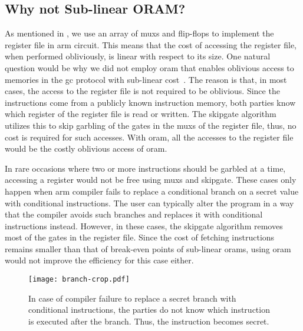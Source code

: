 \subsection{Why not Sub-linear ORAM?}
As mentioned in , we use an array of \acrshort{mux}s and flip-flops to implement the register file in \gls{arm} circuit.
This means that the cost of accessing the register file, when performed obliviously, is linear with respect to its size.
One natural question would be why we did not employ \acrfull{oram} that enables oblivious access to memories in the \acrshort{gc} protocol with sub-linear cost~\cite{wang2014scoram, zahur2016revisit}.
The reason is that, in most cases, the access to the register file is not required to be oblivious.
Since the instructions come from a publicly known instruction memory, both parties know which register of the register file is read or written.
The \gls{skipgate} algorithm utilizes this to skip garbling of the gates in the \acrshort{mux}s of the register file, thus, no cost is required for such accesses.
With \acrshort{oram}, all the accesses to the register file would be the costly oblivious access of \acrshort{oram}.

In rare occasions where two or more instructions should be garbled at a time, accessing a register would not be free using \acrshort{mux}s and \gls{skipgate}.
These cases only happen when \gls{arm} compiler fails to replace a conditional branch on a secret value with conditional instructions.
The user can typically alter the program in a way that the compiler avoids such branches and replaces it with conditional instructions instead.
However, in these cases, the \gls{skipgate} algorithm removes most of the gates in the register file.
Since the cost of fetching instructions remains smaller than that of break-even points of sub-linear \acrshort{oram}s, using \acrshort{oram} would not improve the efficiency for this case either.

\begin{figure}
\centering
\texttt{[image: branch-crop.pdf]}
\caption{In case of compiler failure to replace a secret branch with conditional instructions, the parties do not know which instruction is executed after the branch.
Thus, the instruction becomes secret.}
\label{fig:branch}
\end{figure}

